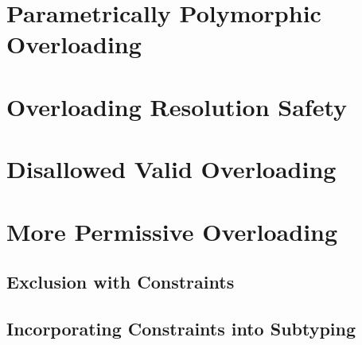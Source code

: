 \documentclass[10pt,preprint]{sigplanconf}
\begin{document}
\section{Parametrically Polymorphic Overloading}\label{sec:rules}


\section{Overloading Resolution Safety}\label{sec:safety}


\section{Disallowed Valid Overloading}\label{sec:problems}


\section{More Permissive Overloading}\label{sec:exclusion}


\subsection{Exclusion with Constraints}\label{sec:constraints}





\subsection{Incorporating Constraints into Subtyping}

\end{document}
